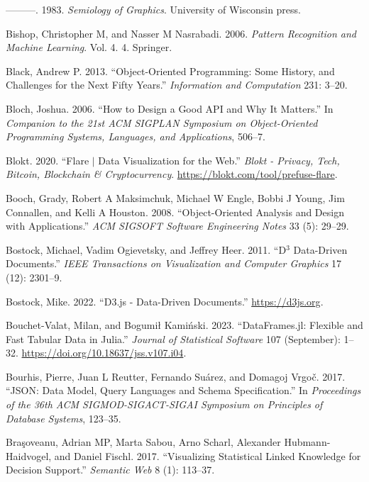 \documentclass[
]{book}
\newlength{\cslhangindent}
\newenvironment{CSLReferences}[2] %
 {\begin{list}{}{%
  \setlength{\itemindent}{0pt}
  \setlength{\leftmargin}{0pt}
  \setlength{\parsep}{0pt}
  \ifodd #1
   \setlength{\leftmargin}{\cslhangindent}
   \setlength{\itemindent}{-1\cslhangindent}
  \fi
  \setlength{\itemsep}{#2\baselineskip}}}
 {\end{list}}
\theoremstyle{definition}
\theoremstyle{definition}
\theoremstyle{definition}
\theoremstyle{definition}
\theoremstyle{remark}
\begin{document}
\begin{CSLReferences}{1}{0}
---------. 1983. \emph{Semiology of Graphics}. University of Wisconsin press.

Bishop, Christopher M, and Nasser M Nasrabadi. 2006. \emph{Pattern Recognition and Machine Learning}. Vol. 4. 4. Springer.

Black, Andrew P. 2013. {``Object-Oriented Programming: Some History, and Challenges for the Next Fifty Years.''} \emph{Information and Computation} 231: 3--20.

Bloch, Joshua. 2006. {``How to Design a Good API and Why It Matters.''} In \emph{Companion to the 21st ACM SIGPLAN Symposium on Object-Oriented Programming Systems, Languages, and Applications}, 506--7.

Blokt. 2020. {``Flare {\(\vert\)} Data Visualization for the Web.''} \emph{Blokt - Privacy, Tech, Bitcoin, Blockchain {\&} Cryptocurrency}. \url{https://blokt.com/tool/prefuse-flare}.

Booch, Grady, Robert A Maksimchuk, Michael W Engle, Bobbi J Young, Jim Connallen, and Kelli A Houston. 2008. {``Object-Oriented Analysis and Design with Applications.''} \emph{ACM SIGSOFT Software Engineering Notes} 33 (5): 29--29.

Bostock, Michael, Vadim Ogievetsky, and Jeffrey Heer. 2011. {``D\(^3\) Data-Driven Documents.''} \emph{IEEE Transactions on Visualization and Computer Graphics} 17 (12): 2301--9.

Bostock, Mike. 2022. {``D3.js - Data-Driven Documents.''} \url{https://d3js.org}.

Bouchet-Valat, Milan, and Bogumił Kamiński. 2023. {``DataFrames.jl: Flexible and Fast Tabular Data in Julia.''} \emph{Journal of Statistical Software} 107 (September): 1--32. \url{https://doi.org/10.18637/jss.v107.i04}.

Bourhis, Pierre, Juan L Reutter, Fernando Suárez, and Domagoj Vrgoč. 2017. {``JSON: Data Model, Query Languages and Schema Specification.''} In \emph{Proceedings of the 36th ACM SIGMOD-SIGACT-SIGAI Symposium on Principles of Database Systems}, 123--35.

Braşoveanu, Adrian MP, Marta Sabou, Arno Scharl, Alexander Hubmann-Haidvogel, and Daniel Fischl. 2017. {``Visualizing Statistical Linked Knowledge for Decision Support.''} \emph{Semantic Web} 8 (1): 113--37.


\end{CSLReferences}
\end{document}
